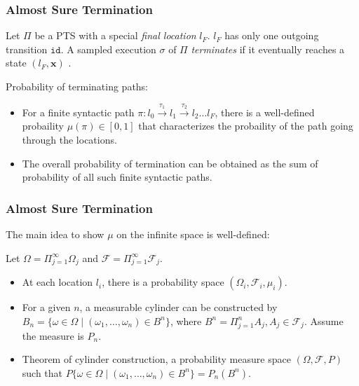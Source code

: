 \documentclass[11pt]{beamer}
\begin{document}
\begin{frame}\frametitle{Almost Sure Termination}

\begin{definition}[Termination]

Let $\Pi$ be a PTS with a special \emph{final location} $l_F$. $l_F$ has only one outgoing transition $\texttt{id}$. A sampled execution $\sigma$ of $\Pi$ \emph{terminates} if it eventually reaches a state $(l_F, \mathbf{x})$ .

\end{definition}

Probability of terminating paths:

\begin{itemize}
\item For a finite syntactic path $\pi:l_0\stackrel{\tau_1}{\rightarrow} l_1 \stackrel{\tau_2}{\rightarrow}l_2\ldots l_F$, there is a well-defined probaility $\mu(\pi)\in[0,1]$ that characterizes the probaility of the path going through the locations.

\item The overall probability of termination can be obtained as the sum of probability of all such finite syntactic paths.
\end{itemize}


\end{frame}


\begin{frame}\frametitle{Almost Sure Termination}

The main idea to show $\mu$ on the infinite space is well-defined:

Let $\Omega = \Pi_{j = 1}^\infty \Omega_j$ and $\mathcal{F} = \Pi_{j = 1}^\infty \mathcal{F}_j$.

\begin{itemize}
\item 
At each location $l_i$, there is a probability  space $(\Omega_i, \mathcal{F}_i, \mu_i)$. 
\item 
For a given $n$, a measurable cylinder can be constructed by $B_n = \{\omega\in \Omega \mid (\omega_1, \ldots, \omega_n)\in B^n\}$, where $B^n = \Pi^n_{j = 1}A_j, A_j\in \mathcal{F}_j$. Assume the measure is $P_n$.
\item Theorem of cylinder construction, a probability measure space $(\Omega, \mathcal{F}, P)$ such that $P\{\omega\in\Omega\mid (\omega_1, \ldots, \omega_n)\in B^n\} = P_n(B^n)$.
\end{itemize}



\end{frame}
\end{document}
